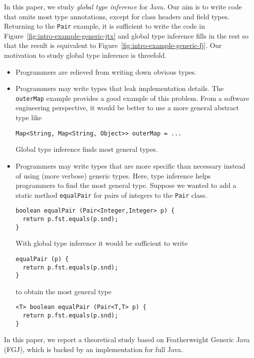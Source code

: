 In this paper, we study \emph{global type inference} for Java. Our aim
is to write code that omits most type annotations, except for class
headers and field types. Returning to the \lstinline{Pair} example, it
is sufficient to write the code in Figure~\ref{fig:intro-example-generic-jtx}
and global type inference fills in the rest so that the result is
equivalent to Figure~\ref{fig:intro-example-generic-fj}. Our
motivation to study global type inference is threefold.
\begin{itemize}
\item Programmers are relieved from writing down obvious types. 
\item Programmers may write types that leak implementation details. The
  \lstinline{outerMap} example provides a good example of this
  problem. From a software engineering
  perspective, it would be better to use a more general abstract type like
\begin{lstlisting}[basicstyle=\ttfamily\fontsize{8}{9.6}\selectfont]
Map<String, Map<String, Object>> outerMap = ...
\end{lstlisting}
  Global type inference finds most general types.
\item Programmers may write types that are more specific than
  necessary instead of using (more verbose) generic types. Here, type
  inference helps programmers to find the most general type. Suppose
  we wanted to add a static  method \lstinline/equalPair/ for pairs of integers to the
  \lstinline/Pair/ class.
\begin{lstlisting}[basicstyle=\ttfamily\fontsize{8}{9.6}\selectfont]
boolean equalPair (Pair<Integer,Integer> p) {
  return p.fst.equals(p.snd);
}
\end{lstlisting}
  With global type inference it would be sufficient to write
\begin{lstlisting}
equalPair (p) {
  return p.fst.equals(p.snd);
}
\end{lstlisting}
  to obtain the most general type
\begin{lstlisting}
<T> boolean equalPair (Pair<T,T> p) {
  return p.fst.equals(p.snd);
}
\end{lstlisting}
\end{itemize}

In this paper, we report a theoretical study based on Featherweight
Generic Java \cite{DBLP:journals/toplas/IgarashiPW01} (FGJ), which is backed
by an implementation for full Java.

